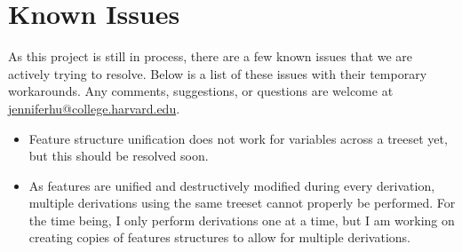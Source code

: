 \documentclass[10.5pt]{article}
\newcommand{\code}[1]{\texttt{#1}}
\begin{document}
\section{Known Issues} 
As this project is still in process, there are a few known issues that we are actively trying to resolve. Below is a list of these issues with their temporary workarounds. Any comments, suggestions, or questions are welcome at \href{mailto:jenniferhu@college.harvard.edu}{jenniferhu@college.harvard.edu}.

\begin{itemize}
	\item Feature structure unification does not work for variables across a treeset yet, but this should be resolved soon.
	\item As features are unified and destructively modified during every derivation, multiple derivations using the same treeset cannot properly be performed. For the time being, I only perform derivations one at a time, but I am working on creating copies of features structures to allow for multiple derivations.

\end{itemize}
\end{document}
